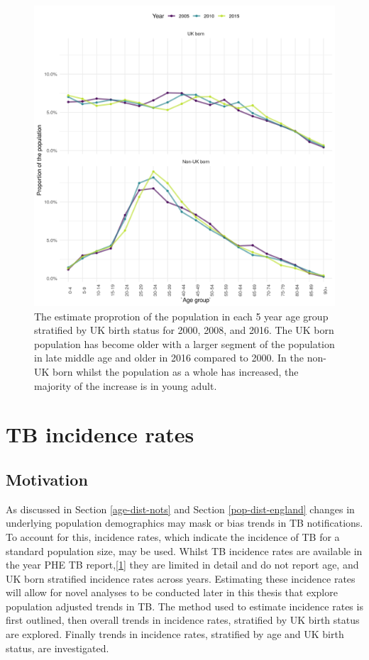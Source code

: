 \documentclass[11pt,twoside]{bristolthesis}
\begin{document}
  \begin{figure}
  
  {\centering \includegraphics[width=0.8\linewidth,]{chapters/tb-epi-england/figures/age-dist-pop} 
  
  }
  
  \caption[The estimate proprotion of the population in each 5 year age group stratified by UK birth status for 2000, 2008, and 2016.]{The estimate proprotion of the population in each 5 year age group stratified by UK birth status for 2000, 2008, and 2016. The UK born population has become older with a larger segment of the population in late middle age and older in 2016 compared to 2000. In the non-UK born whilst the population as a whole has increased, the majority of the increase is in young adult.}\label{fig:age-dist-pop}
  \end{figure}
  \hypertarget{tb-inc-rates-epi}{%
  \section{TB incidence rates}\label{tb-inc-rates-epi}}
  
  \hypertarget{motivation}{%
  \subsection{Motivation}\label{motivation}}
  
  As discussed in Section \ref{age-dist-nots} and Section \ref{pop-dist-england} changes in underlying population demographics may mask or bias trends in TB notifications. To account for this, incidence rates, which indicate the incidence of TB for a standard population size, may be used. Whilst TB incidence rates are available in the year PHE TB report,{[}\protect\hyperlink{ref-PHE2017}{1}{]} they are limited in detail and do not report age, and UK born stratified incidence rates across years. Estimating these incidence rates will allow for novel analyses to be conducted later in this thesis that explore population adjusted trends in TB. The method used to estimate incidence rates is first outlined, then overall trends in incidence rates, stratified by UK birth status are explored. Finally trends in incidence rates, stratified by age and UK birth status, are investigated.
  
\end{document}
